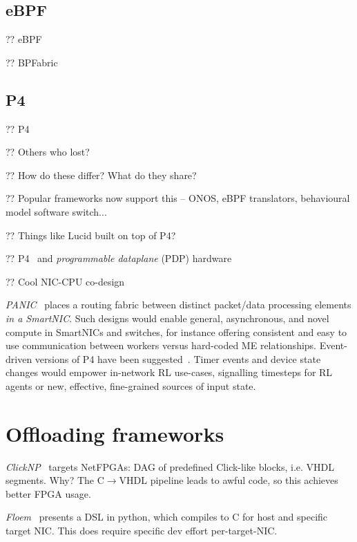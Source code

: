 \subsection{eBPF}
?? eBPF

?? BPFabric

\subsection{P4}
?? P4

?? Others who lost?

?? How do these differ? What do they share?

?? Popular frameworks now support this -- ONOS, eBPF translators, behavioural model software switch...

?? Things like Lucid built on top of P4?~\parencite{DBLP:conf/sigcomm/SonchackLRW21}

?? P4~\parencite{DBLP:journals/ccr/BosshartDGIMRSTVVW14} and \emph{programmable dataplane} (PDP) hardware~\parencite{DBLP:journals/micro/ZilbermanACM14, netronome-smartnic, xilinx-alveo, barefoot-intel}

?? Cool NIC-CPU co-design~\parencite{DBLP:conf/osdi/IbanezMAJ0KM21}

\emph{PANIC}~\parencite{DBLP:conf/hotnets/StephensAS18} places a routing fabric between distinct packet/data processing elements \emph{in a SmartNIC}.
Such designs would enable general, asynchronous, and novel compute in SmartNICs and switches, for instance offering consistent and easy to use communication between workers versus hard-coded ME relationships.
Event-driven versions of P4 have been suggested~\parencite{DBLP:conf/hotnets/IbanezABM19}.
Timer events and device state changes would empower in-network RL use-cases, signalling timesteps for RL agents or new, effective, fine-grained sources of input state.

\section{Offloading frameworks}
\emph{ClickNP}~\parencite{DBLP:conf/sigcomm/LiTLPLXXC16} targets NetFPGAs: DAG of predefined Click-like blocks, i.e. VHDL segments.
Why?
The C$\rightarrow$VHDL pipeline leads to awful code, so this achieves better FPGA usage.

\emph{Floem}~\parencite{DBLP:conf/osdi/PhothilimthanaL18} presents a DSL in python, which compiles to C for host and specific target NIC.
This does require specific dev effort per-target-NIC.

